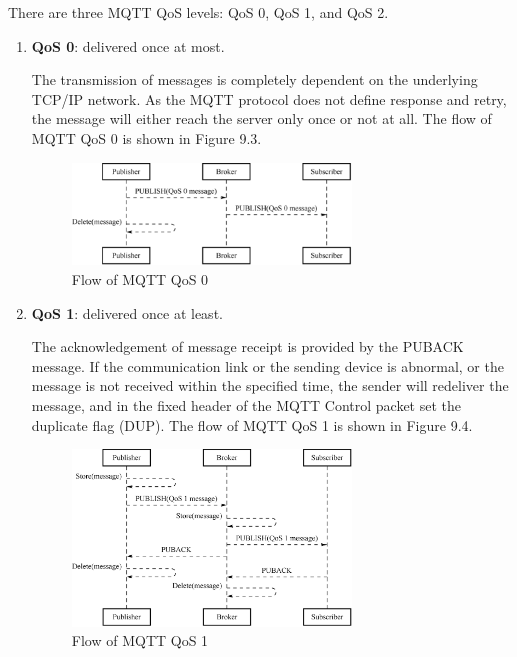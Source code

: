 \documentclass[a4paper,12pt,openany]{book}
\begin{document}
There are three MQTT QoS levels: QoS 0, QoS 1, and QoS 2.

\begin{enumerate}[label=\alph*.,leftmargin=1.5em]
    \item \textbf{QoS 0}: delivered once at most.
    
    The transmission of messages is completely dependent on the underlying TCP/IP network. As the MQTT protocol does not define response and retry, the message will either reach the server only once or not at all. The flow of MQTT QoS 0 is shown in Figure 9.3.

    \begin{figure}[!h]
        \centering
        \includegraphics[width=0.7\textwidth]{D9Z/9-3}
        \caption{Flow of MQTT QoS 0}
    \end{figure}

    \item \textbf{QoS 1}: delivered once at least.
    
    The acknowledgement of message receipt is provided by the PUBACK message. If the communication link or the sending device is abnormal, or the message is not received within the specified time, the sender will redeliver the message, and in the fixed header of the MQTT Control packet set the duplicate flag (DUP). The flow of MQTT QoS 1 is shown in Figure 9.4.

    \begin{figure}[!h]
        \centering
        \includegraphics[width=0.7\textwidth]{D9Z/9-4}
        \caption{Flow of MQTT QoS 1}
    \end{figure}


\end{enumerate}
\end{document}
